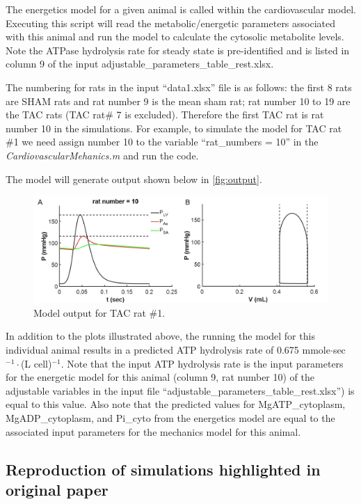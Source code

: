 \documentclass[fleqn,10pt]{physiome}
\begin{document}
The energetics model for a given animal is called within the cardiovascular model. Executing this script will read the metabolic/energetic parameters associated with this animal and run the model to calculate the cytosolic metabolite levels. Note the ATPase hydrolysis rate for steady state is pre-identified and is listed in column 9 of the input adjustable\_parameters\_table\_rest.xlsx. 

The numbering for rats in the input ``data1.xlsx'' file is as follows: the first 8 rats are SHAM rats and rat number 9 is the mean sham rat; rat number 10 to 19 are the TAC rats (TAC rat\# 7 is excluded). Therefore the first TAC rat is rat number 10 in the simulations. For example, to simulate the model for TAC rat \#1 we need assign number 10 to the variable ``rat\_numbers = 10'' in the {\em CardiovascularMehanics.m} and run the code. 

The model will generate output shown below in \autoref{fig:output}. 

\begin{figure}[ht]\centering
\includegraphics[width=1.0\linewidth]{FigS4.jpg}
\caption{Model output for TAC rat \#1.}\label{fig:output}
\end{figure}

In addition to the plots illustrated above, the running the model for this individual animal results in a predicted ATP hydrolysis rate of 0.675 mmole$\cdot$sec$^{-1}\cdot$(L cell)$^{-1}$. Note that the input ATP hydrolysis rate is the input parameters for the energetic model for this animal (column 9, rat number 10) of the adjustable variables in the input file ``adjustable\_parameters\_table\_rest.xlsx'') is equal to this value. Also note that the predicted values for MgATP\_cytoplasm, MgADP\_cytoplasm, and Pi\_cyto from the energetics model are equal to the associated input parameters for the mechanics model for this animal. 

\subsection{Reproduction of simulations highlighted in original paper}
\end{document}
